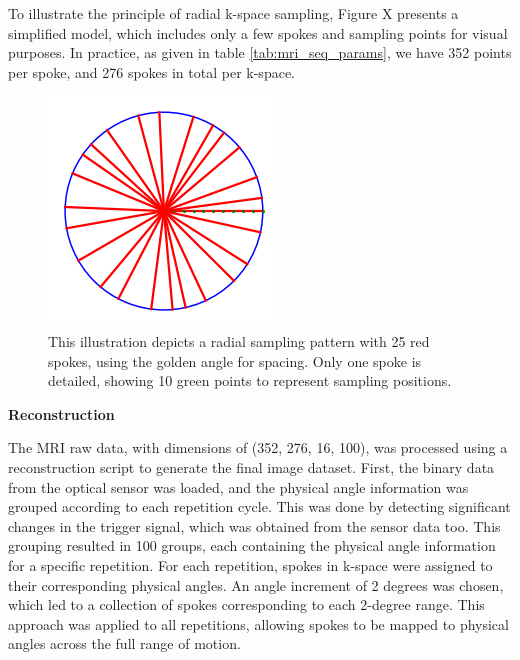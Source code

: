 \documentclass{micro-econ-thesis}
\begin{document}
To illustrate the principle of radial k-space sampling, Figure X presents a simplified model, which includes only a few spokes and sampling points for visual purposes. In practice, as given in table \ref{tab:mri_seq_params}, we have 352 points per spoke, and 276 spokes in total per k-space. 

\begin{figure}[H]
	\centering
	\includegraphics[width=0.7\linewidth]{kspace_depiction}
	\caption{This illustration depicts a radial sampling pattern with 25 red spokes, using the golden angle for spacing. Only one spoke is detailed, showing 10 green points to represent sampling positions.}
	\label{fig:kspacedepiction}
\end{figure}

\textbf{Reconstruction}


The MRI raw data, with dimensions of (352, 276, 16, 100), was processed using a reconstruction script to generate the final image dataset. First, the binary data from the optical sensor was loaded, and the physical angle information was grouped according to each repetition cycle. This was done by detecting significant changes in the trigger signal, which was obtained from the sensor data too. This grouping resulted in 100 groups, each containing the physical angle information for a specific repetition. For each repetition, spokes in k-space were assigned to their corresponding physical angles. An angle increment of 2 degrees was chosen, which led to a collection of spokes corresponding to each 2-degree range. This approach was applied to all repetitions, allowing spokes to be mapped to physical angles across the full range of motion.
\end{document}
